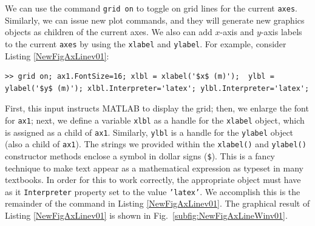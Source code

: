We can use the command \texttt{grid on} to toggle on grid lines for the current \texttt{axes}. Similarly, we can issue new plot commands, and they will generate new graphics objects as children of the current axes. We also can add $x$-axis and $y$-axis labels to the current \texttt{axes} by using the \texttt{xlabel} and \texttt{ylabel}. For example, consider Listing \ref{NewFigAxLinev01}:
\begin{lstlisting}[style=Matlab-editor,label=NewFigAxLinev01,caption={Command Window input to modify the \texttt{ax1}, the current axes object.}]
>> grid on; ax1.FontSize=16; xlbl = xlabel('$x$ (m)');  ylbl = ylabel('$y$ (m)'); xlbl.Interpreter='latex'; ylbl.Interpreter='latex';
\end{lstlisting}
First, this input instructs MATLAB to display the grid; then, we enlarge the font for \texttt{ax1}; next, we define a variable \texttt{xlbl} as a handle for the \texttt{xlabel} object, which is assigned as a child of \texttt{ax1}. Similarly, \texttt{ylbl} is a handle for the \texttt{ylabel} object (also a child of \texttt{ax1}). The strings we provided within the \texttt{xlabel()} and \texttt{ylabel()} constructor methods enclose a symbol in dollar signs (\verb!$!). This is a fancy technique to make text appear as a mathematical expression as typeset in many textbooks. In order for this to work correctly, the appropriate object must have as it \texttt{Interpreter} property set to the value \texttt{'latex'}. We accomplish this is the remainder of the command in Listing \ref{NewFigAxLinev01}. The graphical result of Listing \ref{NewFigAxLinev01} is shown in Fig.\ \ref{subfig:NewFigAxLineWinv01}.

